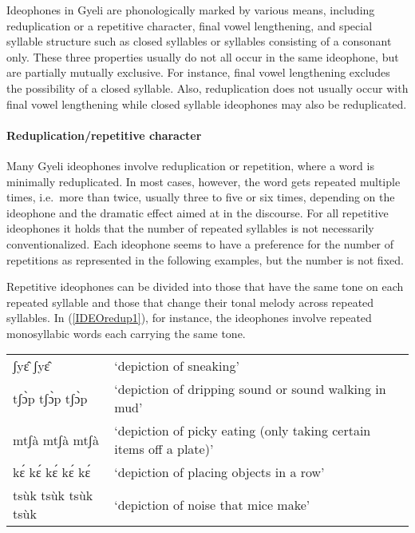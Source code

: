 Ideophones in Gyeli are phonologically  marked by various means, including reduplication or a repetitive character, final vowel lengthening, and special syllable structure such as closed syllables or syllables consisting of a consonant only. These three properties usually do not all occur in the same ideophone, but are partially mutually exclusive. For instance, final vowel lengthening excludes the possibility of a closed syllable. Also, reduplication does not usually  occur with final vowel lengthening while closed syllable ideophones may also be reduplicated. 

\paragraph{Reduplication/repetitive character}

Many Gyeli ideophones involve reduplication or repetition, where a word is minimally reduplicated. In most cases, however, the word gets repeated multiple times, i.e.\ more than twice, usually three to five or six times, depending on the ideophone and the dramatic effect aimed at in the discourse. 
For all repetitive ideophones it holds that the number of repeated syllables is not necessarily conventionalized. Each ideophone seems to have a preference for the number of repetitions as represented in the following examples, but the number is not fixed.

Repetitive ideophones can be divided into those that have the same tone on each repeated syllable and those that change their tonal melody across repeated syllables. In (\ref{IDEOredup1}), for instance, the ideophones involve repeated monosyllabic words each carrying the same tone. 


\begin{exe} \ex \label{IDEOredup1}
\begin{tabular}{lp{8.5cm}}
ʃyɛ̂ ʃyɛ̂ & `depiction of sneaking' \\
tʃɔ̀p tʃɔ̀p tʃɔ̀p & `depiction of dripping sound or sound walking in mud'  \\
mtʃà mtʃà mtʃà & `depiction of picky eating (only taking certain items off a plate)' \\
kɛ́ kɛ́ kɛ́ kɛ́ kɛ́ & `depiction of placing objects in a row' \\
tsùk tsùk tsùk tsùk & `depiction of noise that mice make' \\
\end{tabular}
\end{exe} 

